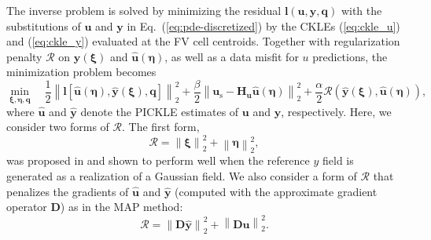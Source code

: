 \documentclass{agujournal2019}
\begin{document}
The inverse problem is solved by minimizing the residual $\mathbf{l}(\mathbf{u}, \mathbf{y}, \mathbf{q})$ with the substitutions of $\mathbf{u}$ and $\mathbf{y}$
in Eq.~(\ref{eq:pde-discretized}) by the CKLEs (\ref{eq:ckle_u}) and (\ref{eq:ckle_y}) evaluated at the FV cell centroids.
Together with regularization penalty $\mathcal{R}$ on $\hat{\mathbf{y}}(\boldsymbol{\xi})$ and $\hat{\mathbf{u}}(\boldsymbol{\eta})$, as well as
a data misfit for $u$ predictions, the minimization problem becomes
\begin{equation}
  \label{eq:pickle-general}
  \min_{\bm{\xi}, \bm{\eta}, \mathbf{q}} \quad \frac{1}{2} \left \| \mathbf{l} \left [ \hat{\mathbf{u}}(\bm{\eta}), \hat{\mathbf{y}}(\bm{\xi}), \mathbf{q} \right ] \right \|^2_2 + \frac{\beta}{2} \left \| \mathbf{u}_{\mathrm{s}} - \mathbf{H}_{\mathbf{u}} \hat{\mathbf{u}}(\bm{\eta}) \right \|^2_2 + \frac{\alpha}{2} \mathcal{R}(\hat{\mathbf{y}}(\boldsymbol{\xi}),\hat{\mathbf{u}}(\boldsymbol{\eta})),
\end{equation}
where $\hat{\bm{u}}$ and $\hat{\bm{y}}$ denote the PICKLE estimates of $\bm{u}$ and $\bm{y}$, respectively.
Here, we consider two forms of $\mathcal{R}$. The first form,
\begin{equation}
 \label{eq:pickle-l2reg}
\mathcal{R} = \left \| \bm{\xi} \right \|^2_2 + \left \| \bm{\eta} \right \|^2_2,
\end{equation}
%
was proposed in \cite{barajassolano-2019-pickle} and shown to perform well when the reference $y$ field is generated as a realization of a Gaussian field. We also consider a form of $\mathcal{R}$ that penalizes the gradients of $\hat{\bm{u}}$ and $\hat{\bm{y}}$ (computed with the approximate gradient operator $\mathbf{D}$) as in the MAP method:
\begin{equation}
    \label{eq:pickle-h1reg}
\mathcal{R}= \left \| \mathbf{D} \hat{\mathbf{y}} \right \|^2_2 + \left \| \mathbf{D} \hat{\mathbf{u}} \right \|^2_2.
\end{equation}
\end{document}
